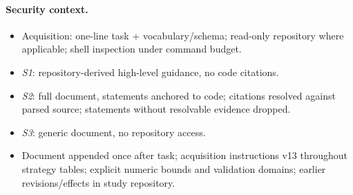 \paragraph{Security context.}
\begin{itemize}
\item Acquisition: one-line task + vocabulary/schema; read-only repository
where applicable; shell inspection under command budget.
\item \emph{S1}: repository-derived high-level guidance, no code citations.
\item \emph{S2}: full document, statements anchored to code; citations
resolved against parsed source; statements without resolvable evidence dropped.
\item \emph{S3}: generic document, no repository access.
\item Document appended once after task; acquisition instructions v13
throughout strategy tables; explicit numeric bounds and validation domains;
earlier revisions/effects in study repository.
\end{itemize}

\begin{table}[t]
\centering
\footnotesize
\setlength{\tabcolsep}{4pt}
\caption{Ten security checks: categories, weakness types, properties, requirement sources. CWE~\citep{cwe}; feature contract; OWASP ASVS~\citep{asvs5}; CERT Oracle Secure Coding Standard for Java~\citep{long2011}.}
\label{tab:mapping}
\end{table}

